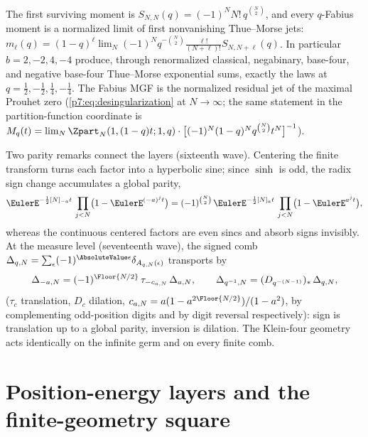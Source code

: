 \documentclass[11pt,oneside]{article}
\numberwithin{equation}{section}
\theoremstyle{definition}
\theoremstyle{remark}
\begin{document}
The first surviving moment is $S_{N,N}(q)=(-1)^NN!\,q^{\binom N2}$, and every
$q$-Fabius moment is a normalized limit of first nonvanishing Thue--Morse
jets:
$m_\ell(q)=(1-q)^\ell\lim_N(-1)^Nq^{-\binom N2}
\tfrac{\ell!}{(N+\ell)!}S_{N,N+\ell}(q)$.  In particular
$b=2,-2,4,-4$ produce, through renormalized classical, negabinary, base-four,
and negative base-four Thue--Morse exponential sums, exactly the laws at
$q=\tfrac12,-\tfrac12,\tfrac14,-\tfrac14$.  The Fabius MGF is the normalized
residual jet of the maximal Prouhet zero
(\cref{p7:eq:desingularization} at $N\to\infty$; the same statement in the
partition-function coordinate is
$M_q(t)=\lim_N\Zpart_N(1,(1-q)t;1,q)\cdot
\bigl[(-1)^N(1-q)^Nq^{\binom N2}t^N\bigr]^{-1}$).

Two parity remarks connect the layers (sixteenth wave).  Centering the finite
transform turns each factor into a hyperbolic sine; since $\sinh$ is odd, the
radix sign change accumulates a global parity,
\begin{equation}\label{p7:eq:sinh-parity}
 \EulerE^{-\frac12[N]_{-a}t}\,\prod_{j<N}\bigl(1-\EulerE^{(-a)^jt}\bigr)
 =(-1)^{\binom N2}\,
 \EulerE^{-\frac12[N]_{a}t}\,\prod_{j<N}\bigl(1-\EulerE^{a^jt}\bigr),
\end{equation}
whereas the continuous centered factors are even sincs and absorb signs
invisibly.  At the measure level (seventeenth wave), the signed comb
$\Delta_{q,N}=\sum_\epsilon(-1)^{\AbsoluteValue\epsilon}\delta_{A_{q,N}(\epsilon)}$
transports by
\begin{equation}\label{p7:eq:comb-transport}
 \Delta_{-a,N}=(-1)^{\Floor{N/2}}\,\tau_{-c_{a,N}}\,\Delta_{a,N},
 \qquad
 \Delta_{q^{-1},N}=(D_{q^{-(N-1)}})_*\,\Delta_{q,N},
\end{equation}
($\tau_c$ translation, $D_c$ dilation, $c_{a,N}=a(1-a^{2\Floor{N/2}})/(1-a^2)$,
by complementing odd-position digits and by digit reversal respectively):
sign is translation up to a global parity, inversion is dilation.  The
Klein-four geometry acts identically on the infinite germ and on every finite
comb.

\section{Position-energy layers and the finite-geometry square}
\label{p7:sec:position-energy}
\end{document}
